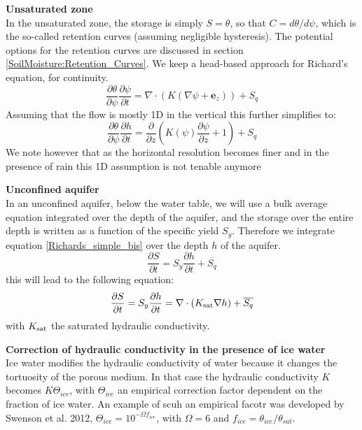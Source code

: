 \documentclass{report}
\begin{document}
{\bf Unsaturated zone}\\
In the unsaturated zone, the storage is simply $S=\theta$, so that $C=d\theta/d\psi$, which is the so-called retention curves (assuming negligible hysteresis). The potential options for the retention curves are discussed in section \ref{SoilMoisture:Retention_Curves}. We keep a head-based approach for Richard's equation, for continuity.
\begin{equation}
     \frac{\partial \theta}{\partial \psi}\frac{\partial \psi}{\partial t}  = \nabla \cdot \left( K \left( \nabla \psi + {\mathbf e_z} \right) \right) + S_q
\label{Richards_simple_unsaturated}
\end{equation}
Assuming that the flow is mostly 1D in the vertical this further simplifies to:
\begin{equation}
     \frac{\partial \theta}{\partial \psi}\frac{\partial h}{\partial t} = \frac{\partial}{\partial z} \left( {K(\psi)\frac{\partial \psi}{\partial z}} + 1 \right) + S_q
\label{Richards_simple_uns_1D}
\end{equation}
We note however that as the horizontal resolution becomes finer and in the presence of rain this 1D assumption is not tenable anymore

{\bf Unconfined aquifer}\\
In an unconfined aquifer, below the water table, we will use a bulk average equation integrated over the depth of the aquifer, and the storage over the entire depth is written as a function of the specific yield $S_y$. Therefore we integrate equation \ref{Richards_simple_bis} over the depth $h$ of the aquifer.
\begin{equation}
     \frac{\partial S}{\partial t} = S_y \frac{\partial h}{\partial t}  + \overline{S_q}
\end{equation}
this will lead to the following equation:
\begin{equation}
     \frac{\partial S}{\partial t} = S_y \frac{\partial h}{\partial t} = \nabla \cdot \left( {K_{\rm sat} \nabla h} \right) + \overline{S_q}
\label{Richards_simple}
\end{equation}
with $K_{\rm sat}$ the saturated hydraulic conductivity. 

{\bf Correction of hydraulic conductivity in the presence of ice water}\\
Ice water modifies the hydraulic conductivity of water because it changes the tortuosity of the porous medium. In that case the hydraulic conductivity $K$ becomes $K \Theta_{ice}$, with $\Theta_{ice}$ an empirical correction factor dependent on the fraction of ice water. An example of scuh an empirical facotr was developed by Swenson et al. 2012, $\Theta_{ice}=10^{-\Omega f_{ice}}$, with $\Omega=6$ and $f_{ice}=\theta_{ice}/\theta_{sat}$.
\end{document}
